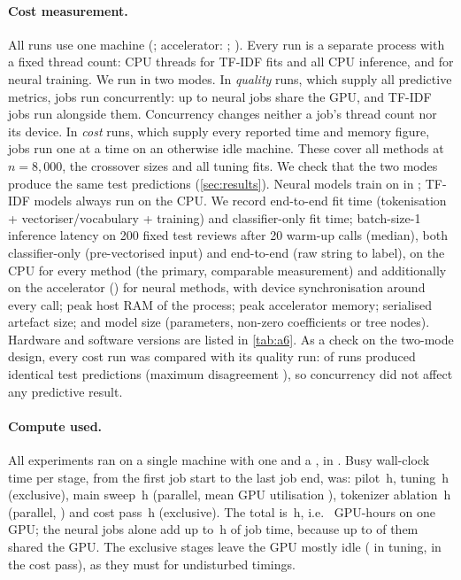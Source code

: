\paragraph{Cost measurement.}
All runs use one machine (\cpuModel{}; accelerator: \gpuModel; \hardwareNote). Every run
is a separate process with a fixed thread count: \nThreads{} CPU threads for TF-IDF fits
and all CPU inference, and \neuralThreads{} for neural training. We run in two modes. In
\emph{quality} runs, which supply all predictive metrics, jobs run concurrently: up to
\kGpu{} neural jobs share the GPU, and \cpuJobs{} TF-IDF jobs run alongside them. Concurrency
changes neither a job's thread count nor its device. In \emph{cost} runs, which supply
every reported time and memory figure, jobs run one at a time on an otherwise idle machine.
These cover all methods at $n=8{,}000$, the crossover sizes and all tuning fits. We check
that the two modes produce the same test predictions (\cref{sec:results}). Neural
models train on \trainDevice{} in \precisionUsed{}; TF-IDF models always run on the CPU. We record end-to-end fit
time (tokenisation + vectoriser/vocabulary + training) and classifier-only fit time;
batch-size-1 inference latency on 200 fixed test reviews after 20 warm-up calls
(median), both classifier-only (pre-vectorised input) and end-to-end (raw string to
label), on the CPU for every method (the primary, comparable measurement) and
additionally on the accelerator (\accelDevice) for neural methods, with device
synchronisation around every call; peak host RAM of the process; peak accelerator
memory; serialised artefact size; and model size
(parameters, non-zero coefficients or tree nodes). Hardware and software versions
are listed in \cref{tab:a6}. As a check on the two-mode design, every cost run was compared
with its quality run: \detIdentical{} of \detRuns{} runs produced identical test
predictions (maximum disagreement \detMaxDisagree), so concurrency did not affect any
predictive result.

\paragraph{Compute used.}
All experiments ran on a single machine with one \gpuModel{} and a \cpuModel{},
in \precisionUsed. Busy wall-clock time per stage, from the first job start to the last job
end, was: pilot \wallPilot{}\,h, tuning \wallTuning{}\,h (exclusive), main sweep
\wallSweep{}\,h (parallel, mean GPU utilisation \gpuUtilSweep), tokenizer ablation
\wallAblation{}\,h (parallel, \gpuUtilAblation) and cost pass \wallCostPass{}\,h
(exclusive). The total is \wallTotal{}\,h, i.e.\ \wallTotal{} GPU-hours on one GPU; the
neural jobs alone add up to \gpuJobHours{}\,h of job time, because up to \kGpu{} of them
shared the GPU. The exclusive stages leave the GPU mostly idle (\gpuUtilTuning{} in tuning,
\gpuUtilCostPass{} in the cost pass), as they must for undisturbed timings.

